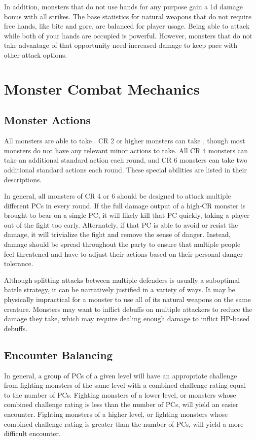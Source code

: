         In addition, monsters that do not use hands for any purpose gain a \plus1d damage bonus with all strikes.
        The base statistics for natural weapons that do not require free hands, like bite and gore, are balanced for player usage.
        Being able to attack while both of your hands are occupied is powerful.
        However, monsters that do not take advantage of that opportunity need increased damage to keep pace with other attack options.

\section{Monster Combat Mechanics}

    \subsection{Monster Actions}
        All monsters are able to take .
        CR 2 or higher monsters can take , though most monsters do not have any relevant minor actions to take.
        All CR 4 monsters can take an additional standard action each round, and CR 6 monsters can take two additional standard actions each round.
        These special abilities are listed in their descriptions.

        In general, all monsters of CR 4 or 6 should be designed to attack multiple different PCs in every round.
        If the full damage output of a high-CR monster is brought to bear on a single PC, it will likely kill that PC quickly, taking a player out of the fight too early.
        Alternately, if that PC is able to avoid or resist the damage, it will trivialize the fight and remove the sense of danger.
        Instead, damage should be spread throughout the party to ensure that multiple people feel threatened and have to adjust their actions based on their personal danger tolerance.

        Although splitting attacks between multiple defenders is usually a suboptimal battle strategy, it can be narratively justified in a variety of ways.
        It may be physically impractical for a monster to use all of its natural weapons on the same creature.
        Monsters may want to inflict debuffs on multiple attackers to reduce the damage they take, which may require dealing enough damage to inflict HP-based debuffs.

    \subsection{Encounter Balancing}\label{Encounter Balancing}
        In general, a group of PCs of a given level will have an appropriate challenge from fighting monsters of the same level with a combined challenge rating equal to the number of PCs.
        Fighting monsters of a lower level, or monsters whose combined challenge rating is less than the number of PCs, will yield an easier encounter.
        Fighting monsters of a higher level, or fighting monsters whose combined challenge rating is greater than the number of PCs, will yield a more difficult encounter.

